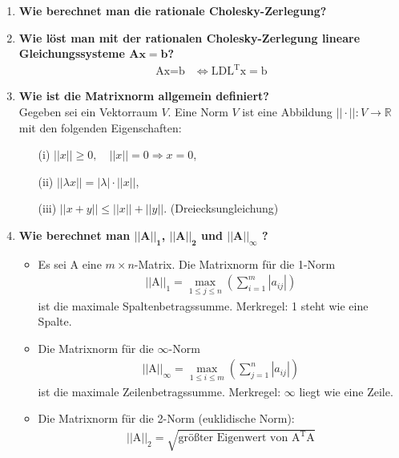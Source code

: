 \begin{enumerate}
		\item \textbf{Wie berechnet man die rationale Cholesky-Zerlegung?} \\
			
		
		\item \textbf{Wie löst man mit der rationalen Cholesky-Zerlegung lineare Gleichungssysteme \(\mathbf{Ax=b}\)?}
			\begin{align*}
				\text{Ax}=\text{b}&\Longleftrightarrow \text{LDL}^\text{T}\text{x}=\text{b}
			\end{align*}
		
		\item \textbf{Wie ist die Matrixnorm allgemein definiert?} \\
			Gegeben sei ein Vektorraum \(V\). Eine Norm \(V\) ist eine Abbildung \(||\cdot||:V\rightarrow\mathbb{R}\) mit den folgenden Eigenschaften:
			\begin{itemize}
				\item[(i)] \(||x||\geq 0,\quad ||x||=0\Rightarrow x=0\),
				\item[(ii)] \(||\lambda x||=|\lambda|\cdot||x||\),
				\item[(iii)] \(||x+y||\leq||x||+||y||\). (Dreiecksungleichung)
			\end{itemize}
		
		\pagebreak
		
			\item \textbf{Wie berechnet man \(\mathbf{||\text{A}||_1}\), \(\mathbf{||\text{A}||_2}\) und \(\mathbf{||\text{A}||_\infty}\) ?} \\
			\begin{itemize}
				\item Es sei A eine \(m\times n\)-Matrix.
					Die Matrixnorm für die 1-Norm
					\begin{align*}
						||\text{A}||_1=\underset{1\leq j\leq n}{\max}\left( \sum_{i=1}^{m}|a_{ij}|\right) 
					\end{align*}
					ist die maximale Spaltenbetragssumme. Merkregel: 1 steht wie eine Spalte.
				\item Die Matrixnorm für die \(\infty\)-Norm
					\begin{align*}
						||\text{A}||_\infty=\underset{1\leq i\leq m}{\max}\left( \sum_{j=1}^{n}|a_{ij}|\right)
					\end{align*}
					ist die maximale Zeilenbetragssumme. Merkregel: \(\infty\) liegt wie eine Zeile.
				\item Die Matrixnorm für die 2-Norm (euklidische Norm):
					\begin{align*}
						||\text{A}||_2=\sqrt{\text{größter Eigenwert von A}^\text{T}\text{A}}
					\end{align*}
			\end{itemize}		
			

\end{enumerate}
